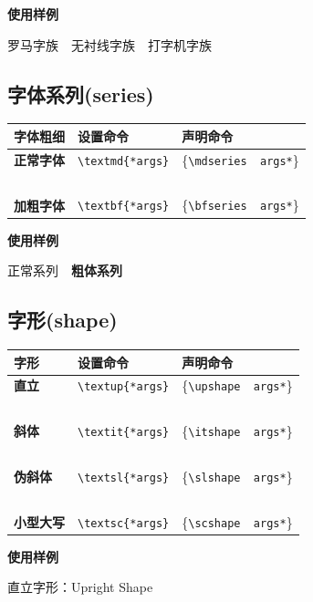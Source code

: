 \documentclass[fontset=windows, 12pt]{article}
\newcommand{\cmd}[2][\{*args\}]{\texttt{\textbackslash#2#1}}
\newcommand{\tb}[1]{\textbf{#1}}
\begin{document}
\noindent\textbf{使用样例}

{\rmfamily 罗马字族}~~{\sffamily 无衬线字族}~~{\ttfamily 打字机字族}

\subsection{字体系列(series)}
\begin{center}
    \begin{tabular}{p{5em}p{12em}p{12em}}
        \toprule
        \textbf{字体粗细} & \textbf{设置命令} & \textbf{声明命令}\\
        \hline
        \textbf{正常字体} & \cmd{textmd} & \ttfamily\{\cmd[~~args*]{mdseries}\} \\
        ~\\
        \tb{加粗字体} &  \cmd{textbf} &  \ttfamily\{\cmd[~~args*]{bfseries}\} \\
        \bottomrule
    \end{tabular} 
\end{center}

\noindent\textbf{使用样例}

{\mdseries 正常系列}~~{\bfseries 粗体系列}


\subsection{字形(shape)}
\begin{center}
    \begin{tabular}{p{5em}p{12em}p{12em}}
        \toprule
        \textbf {字形} & \textbf{设置命令} & \textbf{声明命令}\\
        \hline
        \textbf{直立} & \cmd{textup} & \ttfamily\{\cmd[~~args*]{upshape}\} \\
        ~\\
        \tb{斜体} &  \cmd{textit} &  \ttfamily\{\cmd[~~args*]{itshape}\} \\
        ~\\
        \tb{伪斜体} & \cmd{textsl} & \ttfamily\{\cmd[~~args*]{slshape}\} \\
        ~\\
        \tb{小型大写} &  \cmd{textsc} &  \ttfamily\{\cmd[~~args*]{scshape}\} \\
        \bottomrule
    \end{tabular} 
\end{center}

\noindent\textbf{使用样例}

直立字形：{\upshape Upright Shape}
\end{document}
